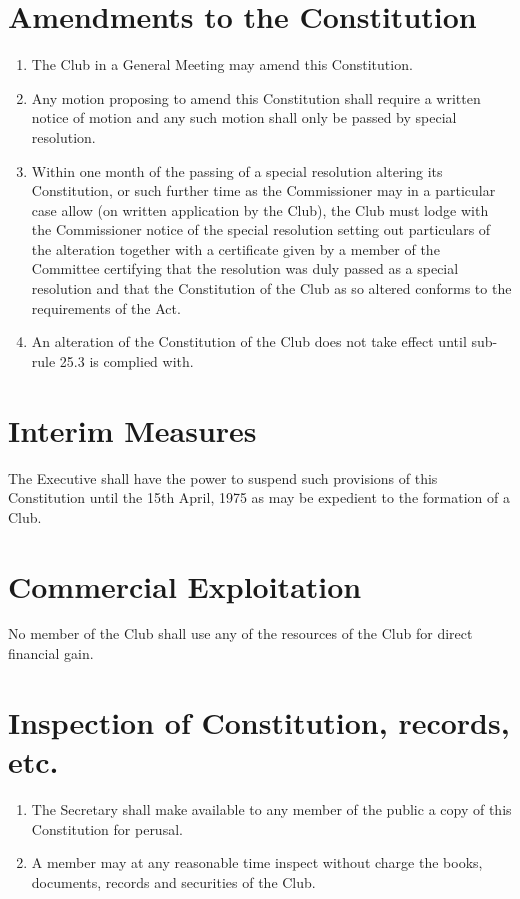 \documentclass[11pt]{article} %
\begin{document}
\section{Amendments to the Constitution}
\begin{enumerate}
	\item The Club in a General Meeting may amend this Constitution.
	\item Any motion proposing to amend this Constitution shall require a written notice of motion and any such motion shall only be passed by special resolution.
	\item Within one month of the passing of a special resolution altering its Constitution, or such further time as the Commissioner may in a particular case allow (on written application by the Club), the Club must lodge with the Commissioner notice of the special resolution setting out particulars of the alteration together with a certificate given by a member of the Committee certifying that the resolution was duly passed as a special resolution and that the Constitution of the Club as so altered conforms to the requirements of the Act.
	\item An alteration of the Constitution of the Club does not take effect until sub-rule 25.3 is complied with.
\end{enumerate}

\section{Interim Measures}
The Executive shall have the power to suspend such provisions of this Constitution until the 15th April, 1975 as may be expedient to the formation of a Club.

\section{Commercial Exploitation}
No member of the Club shall use any of the resources of the Club for direct financial gain.

\section{Inspection of Constitution, records, etc.}
\begin{enumerate}
	\item The Secretary shall make available to any member of the public a copy of this Constitution for perusal.
	\item A member may at any reasonable time inspect without charge the books, documents, records and securities of the Club.
\end{enumerate}
\end{document}
